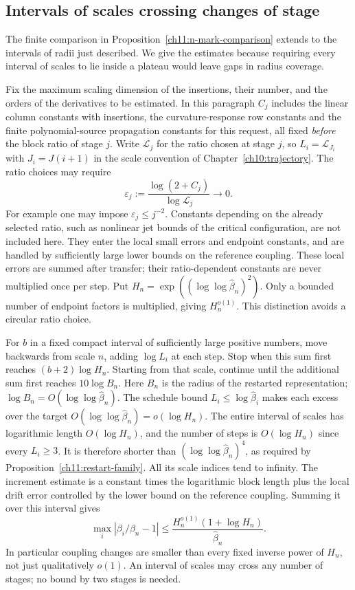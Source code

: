 \subsection{Intervals of scales crossing changes of stage}
\label{ch17:variable-windows}

The finite comparison in Proposition~\ref{ch11:n-mark-comparison}
extends to the intervals of radii just described. We give the estimates
because requiring every interval of scales to lie inside a plateau would leave
gaps in radius coverage.

Fix the maximum scaling dimension of the insertions, their number, and
the orders of the derivatives to be estimated. In this paragraph
$C_j$ includes the linear column constants with insertions, the curvature-response
row constants and the finite polynomial-source propagation constants
for this request, all fixed \emph{before} the block ratio of stage $j$.
Write $\mathscr L_j$ for the ratio chosen at stage $j$, so
$L_i=\mathscr L_{J_i}$ with $J_i=J(i+1)$ in the scale convention
of Chapter~\ref{ch10:trajectory}. The ratio choices may require
\[
 \varepsilon_j:=\frac{\log(2+C_j)}{\log\mathscr L_j}\longrightarrow0.
\]
For example one may impose $\varepsilon_j\le j^{-2}$.
Constants depending on the already selected ratio, such as nonlinear
jet bounds of the critical configuration, are not included here. They enter the local
small errors and endpoint constants, and are handled by sufficiently large lower bounds on the reference coupling.
These local errors are summed after transfer; their ratio-dependent
constants are never multiplied once per step. Put $H_n=\exp((\log\log\widehat\beta_n)^2)$. Only a bounded number
of endpoint factors is multiplied, giving $H_n^{o(1)}$.
This distinction avoids a circular ratio choice.

For $b$ in a fixed compact interval of sufficiently large positive
numbers, move backwards from scale $n$, adding $\log L_i$ at each step.
Stop when this sum first reaches $(b+2)\log H_n$. Starting from that
scale, continue until the additional sum first reaches $10\log B_n$. Here $B_n$ is the radius of the restarted representation;
$\log B_n=O(\log\log\widehat\beta_n)$.
The schedule bound $L_i\le\log\widehat\beta_i$ makes each
excess over the target $O(\log\log\widehat\beta_n)=o(\log H_n)$.
The entire interval of scales has logarithmic length $O(\log H_n)$, and the
number of steps is $O(\log H_n)$ since every $L_i\ge3$.
It is therefore shorter than $(\log\log\widehat\beta_n)^4$,
as required by Proposition~\ref{ch11:restart-family}.
All its scale indices tend to infinity. The increment estimate is a
constant times the logarithmic block length plus the
local drift error controlled by the lower bound on the reference coupling. Summing it over this interval gives
\[
 \max_i|\beta_i/\beta_n-1|
 \le \frac{H_n^{o(1)}(1+\log H_n)}{\widehat\beta_n}.
\]
In particular coupling changes are smaller than every fixed inverse
power of $H_n$, not just qualitatively $o(1)$. An interval of scales may cross any number of stages; no bound by two
stages is needed.

